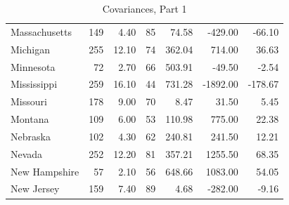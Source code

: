 \documentclass[nohyper,justified]{tufte-handout}\usepackage[]{graphicx}\usepackage[]{color}
\begin{document}
\begin{table}[ht]
\begin{tabular}{lrrrrrr}
  Massachusetts & 149 & 4.40 &  85 & 74.58 & -429.00 & -66.10 \\ 
   \rowcolor[gray]{0.95}Michigan & 255 & 12.10 &  74 & 362.04 & 714.00 & 36.63 \\ 
  Minnesota &  72 & 2.70 &  66 & 503.91 & -49.50 & -2.54 \\ 
   \rowcolor[gray]{0.95}Mississippi & 259 & 16.10 &  44 & 731.28 & -1892.00 & -178.67 \\ 
  Missouri & 178 & 9.00 &  70 & 8.47 & 31.50 & 5.45 \\ 
   \rowcolor[gray]{0.95}Montana & 109 & 6.00 &  53 & 110.98 & 775.00 & 22.38 \\ 
  Nebraska & 102 & 4.30 &  62 & 240.81 & 241.50 & 12.21 \\ 
   \rowcolor[gray]{0.95}Nevada & 252 & 12.20 &  81 & 357.21 & 1255.50 & 68.35 \\ 
  New Hampshire &  57 & 2.10 &  56 & 648.66 & 1083.00 & 54.05 \\ 
   \rowcolor[gray]{0.95}New Jersey & 159 & 7.40 &  89 & 4.68 & -282.00 & -9.16 \\ 
   \bottomrule
\end{tabular}
\caption{Covariances, Part 1} 
\end{table}
\end{document}
